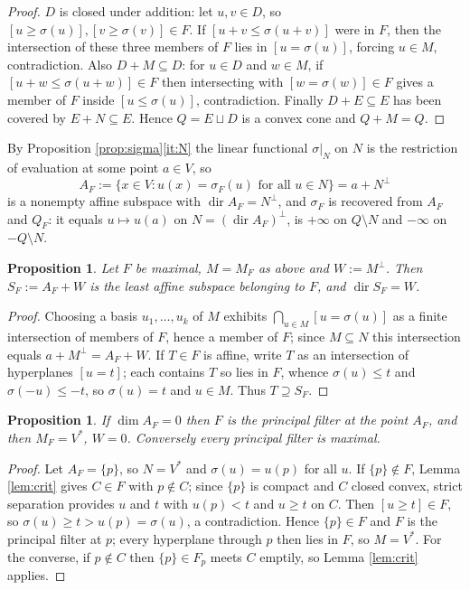 \documentclass[11pt]{amsart}
\theoremstyle{plain}
\newtheorem{proposition}[theorem]{Proposition}
\theoremstyle{definition}
\DeclareMathOperator{\dir}{dir}
\newcommand{\Vs}{V^{*}}
\begin{document}
\begin{proof}
$D$ is closed under addition: let $u,v\in D$, so $[u\ge\sigma(u)],[v\ge\sigma(v)]\in F$. If $[u+v\le\sigma(u+v)]$ were in $F$, then the intersection of these three members of $F$ lies in $[u=\sigma(u)]$, forcing $u\in M$, contradiction. Also $D+M\subseteq D$: for $u\in D$ and $w\in M$, if $[u+w\le\sigma(u+w)]\in F$ then intersecting with $[w=\sigma(w)]\in F$ gives a member of $F$ inside $[u\le\sigma(u)]$, contradiction. Finally $D+E\subseteq E$ has been covered by $E+N\subseteq E$. Hence $Q=E\sqcup D$ is a convex cone and $Q+M=Q$.
\end{proof}

By Proposition \ref{prop:sigma}\eqref{it:N} the linear functional $\sigma|_N$ on $N$ is the restriction of evaluation at some point $a\in V$, so
\[
A_F:=\{x\in V:u(x)=\sigma_F(u)\text{ for all }u\in N\}=a+N^{\perp}
\]
is a nonempty affine subspace with $\dir A_F=N^{\perp}$, and $\sigma_F$ is recovered from $A_F$ and $Q_F$: it equals $u\mapsto u(a)$ on $N=(\dir A_F)^{\perp}$, is $+\infty$ on $Q\setminus N$ and $-\infty$ on $-Q\setminus N$.

\begin{proposition}\label{prop:supp}
Let $F$ be maximal, $M=M_F$ as above and $W:=M^{\perp}$. Then $S_F:=A_F+W$ is the least affine subspace belonging to $F$, and $\dir S_F=W$.
\end{proposition}

\begin{proof}
Choosing a basis $u_1,\dots,u_k$ of $M$ exhibits $\bigcap_{u\in M}[u=\sigma(u)]$ as a finite intersection of members of $F$, hence a member of $F$; since $M\subseteq N$ this intersection equals $a+M^{\perp}=A_F+W$. If $T\in F$ is affine, write $T$ as an intersection of hyperplanes $[u=t]$; each contains $T$ so lies in $F$, whence $\sigma(u)\le t$ and $\sigma(-u)\le-t$, so $\sigma(u)=t$ and $u\in M$. Thus $T\supseteq S_F$.
\end{proof}

\begin{proposition}\label{prop:point}
If $\dim A_F=0$ then $F$ is the principal filter at the point $A_F$, and then $M_F=\Vs$, $W=0$. Conversely every principal filter is maximal.
\end{proposition}

\begin{proof}
Let $A_F=\{p\}$, so $N=\Vs$ and $\sigma(u)=u(p)$ for all $u$. If $\{p\}\notin F$, Lemma \ref{lem:crit} gives $C\in F$ with $p\notin C$; since $\{p\}$ is compact and $C$ closed convex, strict separation provides $u$ and $t$ with $u(p)<t$ and $u\ge t$ on $C$. Then $[u\ge t]\in F$, so $\sigma(u)\ge t>u(p)=\sigma(u)$, a contradiction. Hence $\{p\}\in F$ and $F$ is the principal filter at $p$; every hyperplane through $p$ then lies in $F$, so $M=\Vs$. For the converse, if $p\notin C$ then $\{p\}\in F_p$ meets $C$ emptily, so Lemma \ref{lem:crit} applies.
\end{proof}
\end{document}
